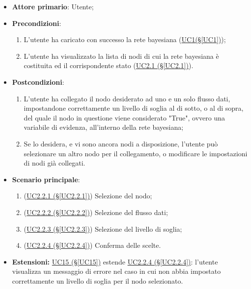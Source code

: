 \begin{itemize}
\item \textbf{Attore primario}: Utente;
\item \textbf{Precondizioni}: 
\begin{enumerate}
	\item L'utente ha caricato con successo la rete bayesiana (\hyperref[UC1]{UC1(§\ref*{UC1})});
	\item L'utente ha visualizzato la lista di nodi di cui la rete bayesiana è costituita ed il corrispondente stato 			(\hyperref[UC2.1]{UC2.1 (§\ref*{UC2.1})}).
\end{enumerate}
\item \textbf{Postcondizioni}: 
	\begin{enumerate}
	\item L'utente ha collegato il nodo desiderato ad uno e un solo flusso dati, impostandone correttamente un livello di soglia al di sotto, o al di sopra, del quale il nodo in questione viene considerato "True", ovvero una variabile di evidenza, all'interno della rete bayesiana;
	\item Se lo desidera, e vi sono ancora nodi a disposizione, l’utente può selezionare un altro nodo per il collegamento, o modificare le impostazioni di nodi già collegati.
	\end{enumerate}
\item \textbf{Scenario principale}:
 \begin{enumerate}
 \item (\hyperref[UC2.2.1]{UC2.2.1 (§\ref*{UC2.2.1})}) Selezione del nodo;
 \item (\hyperref[UC2.2.2]{UC2.2.2 (§\ref*{UC2.2.2})}) Selezione del flusso dati;
 \item (\hyperref[UC2.2.3]{UC2.2.3 (§\ref*{UC2.2.3})}) Selezione del livello di soglia;
 \item (\hyperref[UC2.2.4]{UC2.2.4 (§\ref*{UC2.2.4})}) Conferma delle scelte.
 \end{enumerate}
\item \textbf{Estensioni:} \hyperref[UC15]{UC15 (§\ref*{UC15})} estende \hyperref[UC2.2.4]{UC2.2.4 (§\ref*{UC2.2.4})}: l'utente visualizza un messaggio di errore nel caso in cui non abbia impostato correttamente 	un livello di soglia per il nodo selezionato.
\end{itemize}

